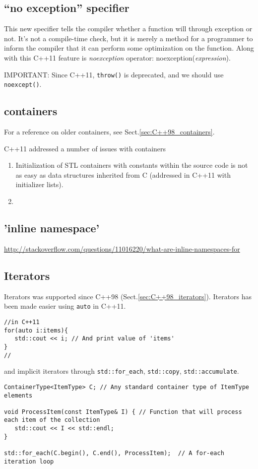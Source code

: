 \subsection{``no exception'' specifier}

This new specifier tells the compiler whether a function will through exception
or not. It's not a compile-time check, but it is merely a method for a
programmer to inform the compiler that it can perform some optimization on the
function. Along with this C++11 feature is {\it noexception} operator:
noexception({\it expression}).

IMPORTANT: Since C++11, \verb!throw()! is deprecated, and we should use
\verb!noexcept()!.

\subsection{containers}
\label{sec::C++11_containers}
\label{sec::containers_C++11}

For a reference on older containers, see Sect.\ref{sec:C++98_containers}.

C++11 addressed a number of issues with containers
\begin{enumerate}
  \item   Initialization of STL containers with constants within the source code is not as easy as data structures inherited from C (addressed in C++11 with initializer lists).
  \item 
\end{enumerate}



\subsection{'inline namespace'}


\url{http://stackoverflow.com/questions/11016220/what-are-inline-namespaces-for}


\subsection{Iterators}
\label{sec:C++11_iterators}

Iterators was supported since C++98 (Sect.\ref{sec:C++98_iterators}). Iterators
has been made easier using \verb!auto! in C++11.
\begin{lstlisting}
//in C++11
for(auto i:items){
   std::cout << i; // And print value of 'items'
}
//
\end{lstlisting}
and implicit iterators through \verb!std::for_each!, \verb!std::copy!,
\verb!std::accumulate!. 
\begin{lstlisting}
ContainerType<ItemType> C; // Any standard container type of ItemType elements
 
void ProcessItem(const ItemType& I) { // Function that will process each item of the collection
   std::cout << I << std::endl;
}
 
std::for_each(C.begin(), C.end(), ProcessItem);  // A for-each iteration loop
\end{lstlisting}

